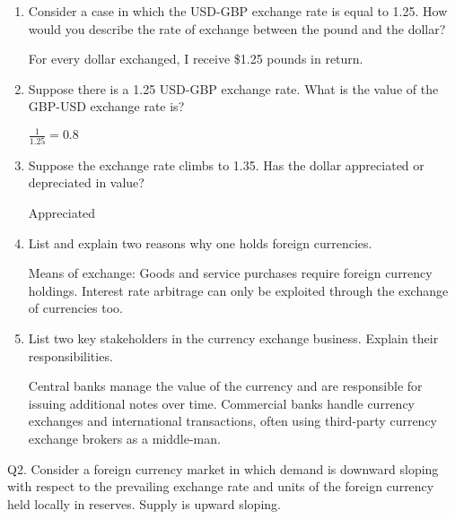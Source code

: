 \documentclass[12pt]{article}
\begin{document}
\begin{enumerate}[1)]
	
	\item Consider a case in which the USD-GBP exchange rate is equal to 1.25. How would you describe the rate of exchange between the pound and the dollar? 
	
	\vspace{0.2in}
	For every dollar exchanged, I receive \$1.25 pounds in return.
	\vspace{0.2in}
	
	\item Suppose there is a 1.25 USD-GBP exchange rate. What is the value of the GBP-USD exchange rate is?
	
	\vspace{0.2in}
	$\frac{1}{1.25}=0.8$
	\vspace{0.2in}
	
	\newpage
	
	\item Suppose the exchange rate climbs to 1.35. Has the dollar appreciated or depreciated in value?
	
	\vspace{0.2in}
	Appreciated
	\vspace{0.2in}
	
	\item List and explain two reasons why one holds foreign currencies. 
	
	\vspace{0.2in}
	Means of exchange: Goods and service purchases require foreign currency holdings. 
	Interest rate arbitrage can only be exploited through the exchange of currencies too.
	\vspace{0.2in}
	
	\item List two key stakeholders in the currency exchange business. Explain their responsibilities.
	
	\vspace{0.2in}
	Central banks manage the value of the currency and are responsible for issuing additional notes over time. 
	Commercial banks handle currency exchanges and international transactions, often using third-party currency exchange brokers as a middle-man.
	\vspace{0.2in}
	
\end{enumerate}

\newpage

\noindent Q2. Consider a foreign currency market in which demand is downward sloping with respect to the prevailing exchange rate and units of the foreign currency held locally in reserves. Supply is upward sloping.
\end{document}
